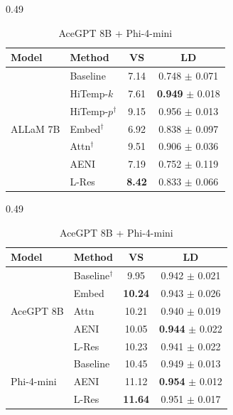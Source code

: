\documentclass[11pt]{article}
\begin{document}
\begin{table}[t]
\centering
\small
\setlength{\tabcolsep}{4pt}
\renewcommand{\arraystretch}{1.1}

\setlength{\tabcolsep}{3pt}
\setlength{\columnsep}{6pt}

\begin{subtable}[t]{0.49\textwidth}
\centering
\begin{tabular}{l l c c}
\toprule
\textbf{Model} & \textbf{Method} & VS & LD \\
\midrule
\multirow{7}{*}{ALLaM 7B}
  & Baseline & 7.14 & 0.748 $\pm$ 0.071 \\
  & HiTemp-$k$ & 7.61 & \textbf{0.949} $\pm$ 0.018 \\
  & HiTemp-$p^\dagger$ & 9.15 & 0.956 $\pm$ 0.013 \\
  \cmidrule(l){2-4}
  & Embed$^\dagger$ & 6.92 & 0.838 $\pm$ 0.097 \\
  & Attn$^\dagger$ & 9.51 & 0.906 $\pm$ 0.036 \\
  & AENI & 7.19 & 0.752 $\pm$ 0.119 \\
  & L-Res & \textbf{8.42} & 0.833 $\pm$ 0.066 \\
\bottomrule
\end{tabular}
\caption{ALLaM 7B}
\end{subtable}
\begin{subtable}[t]{0.49\textwidth}
\centering
\begin{tabular}{l l c c}
\toprule
\textbf{Model} & \textbf{Method} & VS & LD \\
\midrule
\multirow{5}{*}{AceGPT 8B}
  & Baseline$^\dagger$ & 9.95 & 0.942 $\pm$ 0.021 \\
  \cmidrule(l){2-4}
  & Embed & \textbf{10.24} & 0.943 $\pm$ 0.026 \\
  & Attn & 10.21 & 0.940 $\pm$ 0.019 \\
  & AENI & 10.05 & \textbf{0.944} $\pm$ 0.022 \\
  & L-Res & 10.23 & 0.941 $\pm$ 0.022 \\
\midrule
\multirow{3}{*}{Phi-4-mini}
  & Baseline & 10.45 & 0.949 $\pm$ 0.013 \\
  \cmidrule(l){2-4}
  & AENI & 11.12 & \textbf{0.954} $\pm$ 0.012 \\
  & L-Res & \textbf{11.64} & 0.951 $\pm$ 0.017 \\
\bottomrule
\end{tabular}
\caption{AceGPT 8B + Phi-4-mini}
\end{subtable}


\end{table}
\end{document}
